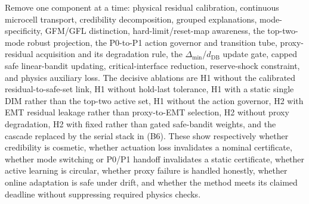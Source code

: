 \documentclass[conference]{IEEEtran}
\begin{document}
Remove one component at a time: physical residual calibration, continuous microcell transport, credibility decomposition, grouped explanations, mode-specificity, GFM/GFL distinction, hard-limit/reset-map awareness, the top-two-mode robust projection, the P0-to-P1 action governor and transition tube, proxy-residual acquisition and its degradation rule, the $\Delta_{\min}$/$d_{\mathrm{DB}}$ update gate, capped safe linear-bandit updating, critical-interface reduction, reserve-shock constraint, and physics auxiliary loss. The decisive ablations are H1 without the calibrated residual-to-safe-set link, H1 without hold-last tolerance, H1 with a static single DIM rather than the top-two active set, H1 without the action governor, H2 with EMT residual leakage rather than proxy-to-EMT selection, H2 without proxy degradation, H2 with fixed rather than gated safe-bandit weights, and the cascade replaced by the serial stack in (B6). These show respectively whether credibility is cosmetic, whether actuation loss invalidates a nominal certificate, whether mode switching or P0/P1 handoff invalidates a static certificate, whether active learning is circular, whether proxy failure is handled honestly, whether online adaptation is safe under drift, and whether the method meets its claimed deadline without suppressing required physics checks.
\end{document}
